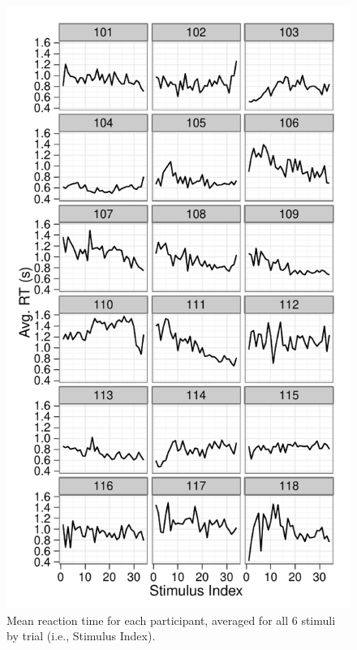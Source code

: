 \begin{figure}[tp]
    \includegraphics{f_all_sS_rt}
    \centering
    \caption{Mean reaction time for each participant, averaged for all 6 stimuli by trial (i.e., Stimulus Index).}
    \label{fig:srt}
\end{figure}

